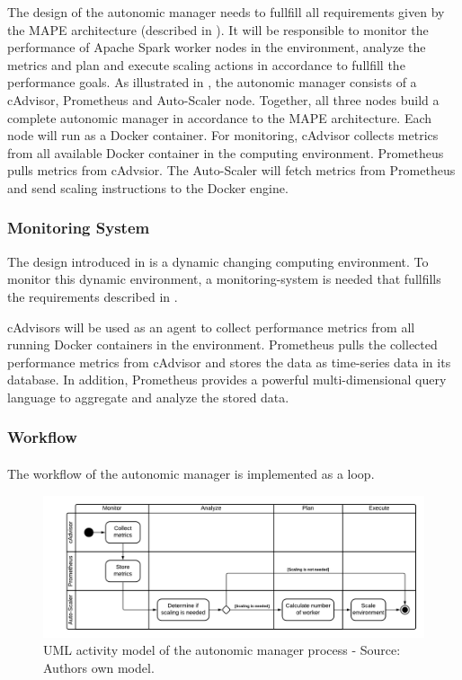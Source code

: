 The design of the autonomic manager needs to fullfill all requirements given by the MAPE architecture (described in ). It will be responsible to monitor the performance of Apache Spark worker nodes in the environment, analyze the metrics and plan and execute scaling actions in accordance to fullfill the performance goals.
As illustrated in , the autonomic manager consists of a cAdvisor, Prometheus and Auto-Scaler node. Together, all three nodes build a complete autonomic manager in accordance to the MAPE architecture. Each node will run as a Docker container.
For monitoring, cAdvisor collects metrics from all available Docker container in the computing environment. Prometheus pulls metrics from cAdvsior. The Auto-Scaler will fetch metrics from Prometheus and send scaling instructions to the Docker engine.


\subsubsection{Monitoring System}
The design introduced in  is a dynamic changing computing environment. To monitor this dynamic environment, a monitoring-system is needed that fullfills the requirements described in .


cAdvisors will be used as an agent to collect performance metrics from all running Docker containers in the environment.
Prometheus pulls the collected performance metrics from cAdvisor and stores the data as time-series data in its database.
In addition, Prometheus provides a powerful multi-dimensional query language to aggregate and analyze the stored data.


\subsubsection{Workflow}

\paragraph{} The workflow of the autonomic manager is implemented as a loop.

\begin{figure}[h]
\centering
\includegraphics[scale=0.50]{images/05_conceptual_design/autonomic_manager/autonomic_manager_workflow}
\caption{UML activity model of the autonomic manager process - Source: Authors own model.}
\label{fig:am-workflow}
\end{figure}
